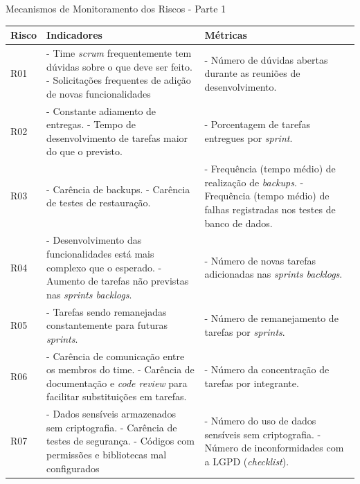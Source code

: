 \documentclass[
	12pt,				%
	openany,			%
	twoside,			%
	a4paper,			%
	english,			%
	french,				%
	spanish,			%
	brazil				%
	]{abntex2}
\begin{document}
 \begin{quadro}[H]
	\caption{Mecanismos de Monitoramento dos Riscos - Parte 1}
	 \label{monitoramento_riscos_1} 
	  \begin{tabular} {|p{3cm}|p{6cm}|p{6cm}|}
		\hline
		\textbf{Risco} & \textbf{Indicadores} & \textbf{Métricas} \\
		\hline
		R01 & 
		- Time \textit{scrum} frequentemente tem dúvidas sobre o que deve ser feito. \newline
		- Solicitações frequentes de adição de novas funcionalidades
		& - Número de dúvidas abertas durante as reuniões de desenvolvimento.
		\\
		\hline
		R02 & 
		- Constante adiamento de entregas. \newline
		- Tempo de desenvolvimento de tarefas maior do que o previsto.
		& - Porcentagem de tarefas entregues por \textit{sprint}.
		\\
		\hline
		R03 & 
		- Carência de backups. \newline
		- Carência de testes de restauração.
		& - Frequência (tempo médio) de realização de \textit{backups}. \newline
		  - Frequência (tempo médio) de falhas registradas nos testes de banco de dados.
		\\
		\hline
		R04 & 
		- Desenvolvimento das funcionalidades está mais complexo que o esperado. \newline
		- Aumento de tarefas não previstas nas \textit{sprints backlogs}.
		& - Número de novas tarefas adicionadas nas \textit{sprints backlogs}. 
		\\
		\hline
		R05 & 
		- Tarefas sendo remanejadas constantemente para futuras \textit{sprints}.
		& - Número de remanejamento de tarefas por \textit{sprints}. 
		\\
		\hline
		R06 & 
		- Carência de comunicação entre os membros do time. \newline
		- Carência de documentação e \textit{code review} para facilitar substituições em tarefas.
		& - Número da concentração de tarefas por integrante. 
		\\
		\hline
		R07 & 
		- Dados sensíveis armazenados sem criptografia. \newline
		- Carência de testes de segurança. \newline
		- Códigos com permissões e bibliotecas mal configurados
		& - Número do uso de dados sensíveis sem criptografia. \newline
		  - Número de inconformidades com a LGPD (\textit{checklist}). 

\end{tabular}
\end{quadro}
\end{document}
